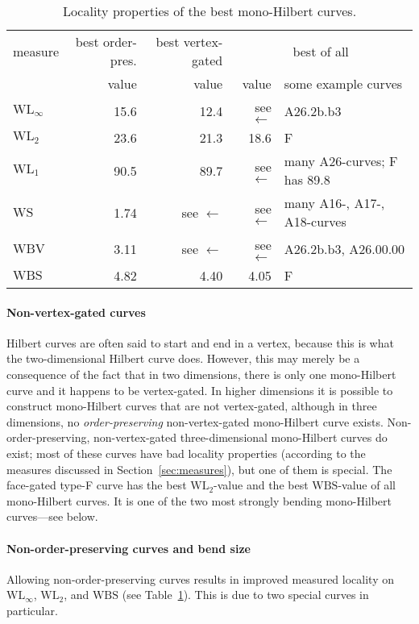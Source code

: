 \documentclass[11pt,a4paper]{article}
\def\WLMax{\ensuremath{\mathrm{WL}_\infty}\xspace}
\def\WLEuc{\ensuremath{\mathrm{WL}_2}\xspace}
\def\WLMan{\ensuremath{\mathrm{WL}_1}\xspace}
\def\WS{\ensuremath{\mathrm{WS}}\xspace}
\def\WBV{\ensuremath{\mathrm{WBV}}\xspace}
\def\WBS{\ensuremath{\mathrm{WBS}}\xspace}
\begin{document}
\begin{table}
\centering
\begin{tabular}{|l|r|r|rl|}
\hline
measure & best order-pres.
        & best vertex-gated
        & \multicolumn{2}{c|}{best of all} \\
        & value
        & value
        & value & some example curves \\
\hline
\WLMax  &             15.6 &             12.4 & see $\leftarrow$ & A26.2b.b3 \\
\WLEuc  &             23.6 &             21.3 &             18.6 & F \\ \WLMan  &             90.5 &             89.7 & see $\leftarrow$ & many A26-curves; F has 89.8\\
\WS     &             1.74 & see $\leftarrow$ & see $\leftarrow$ & many A16-, A17-, A18-curves\\
\WBV    &             3.11 & see $\leftarrow$ & see $\leftarrow$ & A26.2b.b3, A26.00.00 \\
\WBS    &             4.82 &             4.40 &             4.05 & F \\
\hline
\end{tabular}
\caption{Locality properties of the best mono-Hilbert curves.}
\label{tab:mH}
\end{table}

\paragraph{Non-vertex-gated curves}
Hilbert curves are often said to start and end in a vertex, because this is what the two-dimensional Hilbert curve does. However, this may merely be a consequence of the fact that in two dimensions, there is only one mono-Hilbert curve and it happens to be vertex-gated. In higher dimensions it is possible to construct mono-Hilbert curves that are not vertex-gated, although in three dimensions, no \emph{order-preserving} non-vertex-gated mono-Hilbert curve exists. Non-order-preserving, non-vertex-gated three-dimensional mono-Hilbert curves do exist; most of these curves have bad locality properties (according to the measures discussed in Section~\ref{sec:measures}), but one of them is special. The face-gated type-F curve has the best \WLEuc-value and the best \WBS-value of all mono-Hilbert curves. It is one of the two most strongly bending mono-Hilbert curves---see below.

\paragraph{Non-order-preserving curves and bend size}
Allowing non-order-preserving curves results in improved measured locality on $\WLMax$, $\WLEuc$, and $\WBS$ (see Table~\ref{tab:mH}). This is due to two special curves in particular.
\end{document}
